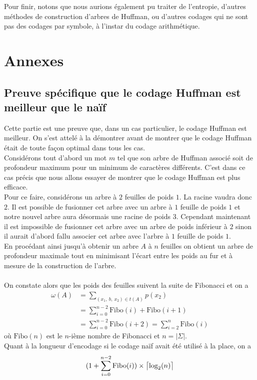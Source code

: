 \documentclass[a4paper, 12pt]{article}
\DeclarePairedDelimiter{\ceil}{\lceil}{\rceil}
\begin{document}
Pour finir, notons que nous aurions également pu traiter de l'entropie, d'autres méthodes de construction d'arbres de Huffman, ou d'autres codages qui ne sont pas des codages par symbole, à l'instar du codage arithmétique.

\newpage

\section{Annexes}
\subsection{Preuve spécifique que le codage Huffman est meilleur que le naïf}
Cette partie est une preuve que, dans un cas particulier, le codage Huffman est meilleur. On s'est attelé à la démontrer avant de montrer que le codage Huffman était de toute façon optimal dans tous les cas. \\

Considérons tout d'abord un mot $m$ tel que son arbre de Huffman associé soit de profondeur maximum pour un minimum de caractères différents. C'est dans ce cas précis que nous allons essayer de montrer que le codage Huffman est plus efficace. \\
Pour ce faire, considérons un arbre à $2$ feuilles de poids $1$. La racine vaudra donc $2$. Il est possible de fusionner cet arbre avec un arbre à $1$ feuille de poids $1$ et notre nouvel arbre aura désormais une racine de poids $3$. Cependant maintenant il est impossible de fusionner cet arbre avec un arbre de poids inférieur à $2$ sinon il aurait d'abord fallu associer cet arbre avec l'arbre à $1$ feuille de poids $1$. \\
En procédant ainsi jusqu'à obtenir un arbre $A$ à $n$ feuilles on obtient un arbre de profondeur maximale tout en minimisant l'écart entre les poids au fur et à mesure de la construction de l'arbre. \\ \\
On constate alors que les poids des feuilles suivent la suite de Fibonacci et on a
\begin{align*}
\omega(A) &= \sum_{(x_1,\ b,\ x_2)\in t(A)} p(x_2)‎‎ \\
&= \sum_{i = 0}^{n-2} \text{Fibo}(i)+\text{Fibo}(i+1) \\
&= \sum_{i = 0}^{n-2} \text{Fibo}(i+2) = \sum_{i = 2}^n \text{Fibo}(i)
\end{align*}
où $\text{Fibo}(n)$ est le $n$-ième nombre de Fibonacci et $n = |\Sigma|$. \\
Quant à la longueur d'encodage si le codage naïf avait été utilisé à la place, on a
$$
(1+\sum_{i = 0}^{n-2}\text{Fibo}(i))\times \ceil[\big]{\text{log}_2(n)}
$$
\end{document}
